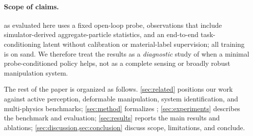 \paragraph{Scope of claims.}
\PTA{} as evaluated here uses a fixed open-loop probe, observations that include simulator-derived aggregate-particle statistics, and an end-to-end task-conditioning latent without calibration or material-label supervision; all training is on sand. We therefore treat the results as a \emph{diagnostic} study of when a minimal probe-conditioned policy helps, not as a complete sensing or broadly robust manipulation system.

The rest of the paper is organized as follows. \cref{sec:related} positions our work against active perception, deformable manipulation, system identification, and multi-physics benchmarks; \cref{sec:method} formalizes \PTA{}; \cref{sec:experiments} describes the benchmark and evaluation; \cref{sec:results} reports the main results and ablations; \cref{sec:discussion,sec:conclusion} discuss scope, limitations, and conclude.
